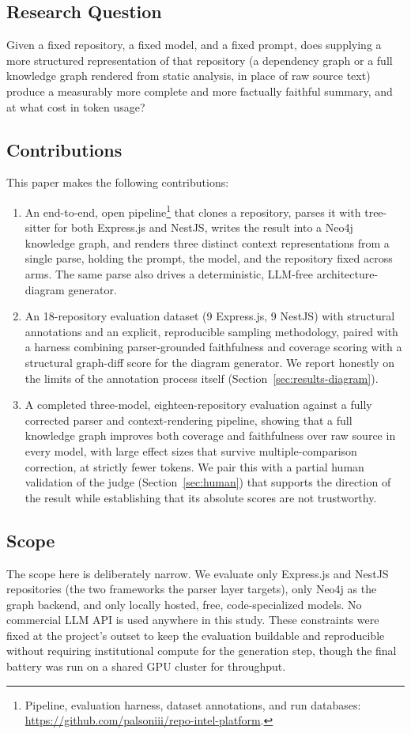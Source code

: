 \documentclass[conference]{IEEEtran}
\begin{document}
\subsection{Research Question}
Given a fixed repository, a fixed model, and a fixed prompt, does supplying a more structured
representation of that repository (a dependency graph or a full knowledge graph rendered from
static analysis, in place of raw source text) produce a measurably more complete and more
factually faithful summary, and at what cost in token usage?

\subsection{Contributions}
This paper makes the following contributions:

\begin{enumerate}
\item An end-to-end, open pipeline\footnote{Pipeline, evaluation harness, dataset annotations,
and run databases: \url{https://github.com/palsoniii/repo-intel-platform}.} that clones a
repository, parses it with tree-sitter for both Express.js and NestJS, writes the result into a
Neo4j knowledge graph, and renders three distinct context representations from a single parse,
holding the prompt, the model, and the repository fixed across arms. The same parse also drives
a deterministic, LLM-free architecture-diagram generator.
\item An 18-repository evaluation dataset (9 Express.js, 9 NestJS) with structural annotations
and an explicit, reproducible sampling methodology, paired with a harness combining
parser-grounded faithfulness and coverage scoring with a structural graph-diff score for the
diagram generator. We report honestly on the limits of the annotation process itself
(Section~\ref{sec:results-diagram}).
\item A completed three-model, eighteen-repository evaluation against a fully corrected parser
and context-rendering pipeline, showing that a full knowledge graph improves both coverage and
faithfulness over raw source in every model, with large effect sizes that survive
multiple-comparison correction, at strictly fewer tokens. We pair this with a partial human
validation of the judge (Section~\ref{sec:human}) that supports the direction of the result
while establishing that its absolute scores are not trustworthy.
\end{enumerate}

\subsection{Scope}
The scope here is deliberately narrow. We evaluate only Express.js and NestJS repositories (the
two frameworks the parser layer targets), only Neo4j as the graph backend, and only locally
hosted, free, code-specialized models. No commercial LLM API is used anywhere in this study.
These constraints were fixed at the project's outset to keep the evaluation buildable and
reproducible without requiring institutional compute for the generation step, though the final
battery was run on a shared GPU cluster for throughput.
\end{document}
